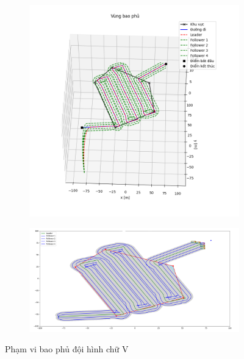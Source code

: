 \begin{figure}
\centering
    \begin{subfigure}[b]{0.8\textwidth}
    \centering
    \includegraphics[width=\textwidth]{chapter5/image/coverage1.png}
    \caption{}
    \label{fig:1}
    \end{subfigure}
    \begin{subfigure}[b]{0.8\textwidth}
    \centering
    \includegraphics[width=\textwidth]{chapter5/image/coverage.png}
    \caption{}
    \label{fig:2}
    \end{subfigure}
    \caption{Phạm vi bao phủ đội hình chữ V}
    \label{fig:coverarea5Robot}
\end{figure}

